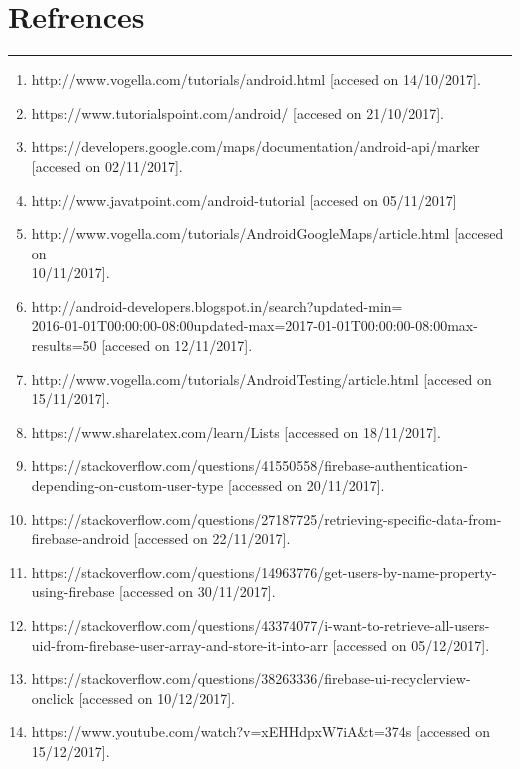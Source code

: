 \chapter{Refrences}\hrule
\label{Chapter:6}
\begin{enumerate}
	\item http://www.vogella.com/tutorials/android.html [accesed on 14/10/2017].
	\item https://www.tutorialspoint.com/android/ [accesed on 21/10/2017].
	\item https://developers.google.com/maps/documentation/android-api/marker [accesed on 02/11/2017].
	\item http://www.javatpoint.com/android-tutorial [accesed on 05/11/2017]
	\item http://www.vogella.com/tutorials/AndroidGoogleMaps/article.html [accesed on \\10/11/2017].
	\item http://android-developers.blogspot.in/search?updated-min=\\2016-01-01T00:00:00-08:00updated-max=2017-01-01T00:00:00-08:00max-results=50 [accesed on 12/11/2017].
	\item 
	http://www.vogella.com/tutorials/AndroidTesting/article.html
	[accesed on 15/11/2017].
	\item 
	https://www.sharelatex.com/learn/Lists [accessed on 18/11/2017].
	\item 
	https://stackoverflow.com/questions/41550558/firebase-authentication-depending-on-custom-user-type [accessed on 20/11/2017].
	\item 
	https://stackoverflow.com/questions/27187725/retrieving-specific-data-from-firebase-android [accessed on 22/11/2017].
	\item 
	https://stackoverflow.com/questions/14963776/get-users-by-name-property-using-firebase [accessed on 30/11/2017].
	\item
	https://stackoverflow.com/questions/43374077/i-want-to-retrieve-all-users-uid-from-firebase-user-array-and-store-it-into-arr [accessed on 05/12/2017].
	\item 
	https://stackoverflow.com/questions/38263336/firebase-ui-recyclerview-onclick [accessed on 10/12/2017].
	\item 
	https://www.youtube.com/watch?v=xEHHdpxW7iA&t=374s [accessed on 15/12/2017].
\end{enumerate}